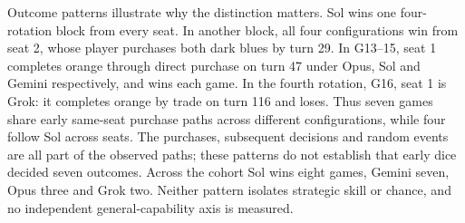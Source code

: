 Outcome patterns illustrate why the distinction matters. Sol wins one four-rotation block from every seat. In another block, all four configurations win from seat 2, whose player purchases both dark blues by turn 29. In G13--15, seat 1 completes orange through direct purchase on turn 47 under Opus, Sol and Gemini respectively, and wins each game. In the fourth rotation, G16, seat 1 is Grok: it completes orange by trade on turn 116 and loses. Thus seven games share early same-seat purchase paths across different configurations, while four follow Sol across seats. The purchases, subsequent decisions and random events are all part of the observed paths; these patterns do not establish that early dice decided seven outcomes. Across the cohort Sol wins eight games, Gemini seven, Opus three and Grok two. Neither pattern isolates strategic skill or chance, and no independent general-capability axis is measured.
\FloatBarrier
